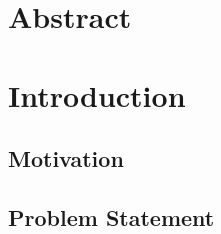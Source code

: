 \documentclass[headsepline,footsepline,footinclude=false,oneside,fontsize=11pt,paper=a4,listof=totoc,bibliography=totoc]{scrbook}
\begin{document}
  \chapter*{Abstract}
\else
  
  
  
  
\fi

\tableofcontents{}

\mainmatter{}

\chapter{Introduction}\label{ch:introduction}

\section{Motivation}\label{sec:intro:motivation}

\section{Problem Statement}\label{sec:intro:problem}
\end{document}
